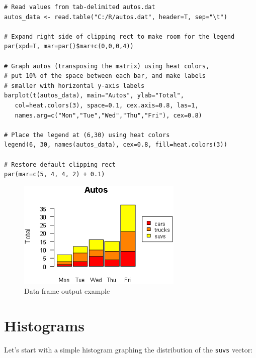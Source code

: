 \documentclass[10pt]{book}
\begin{document}
\begin{lstlisting}
# Read values from tab-delimited autos.dat
autos_data <- read.table("C:/R/autos.dat", header=T, sep="\t") 

# Expand right side of clipping rect to make room for the legend
par(xpd=T, mar=par()$mar+c(0,0,0,4))

# Graph autos (transposing the matrix) using heat colors,  
# put 10% of the space between each bar, and make labels  
# smaller with horizontal y-axis labels
barplot(t(autos_data), main="Autos", ylab="Total", 
   col=heat.colors(3), space=0.1, cex.axis=0.8, las=1,
   names.arg=c("Mon","Tue","Wed","Thu","Fri"), cex=0.8) 
   
# Place the legend at (6,30) using heat colors
legend(6, 30, names(autos_data), cex=0.8, fill=heat.colors(3))
   
# Restore default clipping rect
par(mar=c(5, 4, 4, 2) + 0.1)
\end{lstlisting}
\begin{figure}[H]
    \begin{flushleft}
        \includegraphics[width=0.7\textwidth]{bar_script4.png}
        \caption{Data frame output example}
        \label{fig:dataframe}
    \end{flushleft}
\end{figure}


\section*{Histograms}

Let's start with a simple histogram graphing the distribution of the \texttt{suvs} vector:
\end{document}
